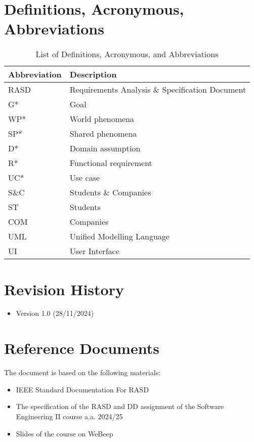 \section{Definitions, Acronymous, Abbreviations}
\begin{table}[H]
\centering
\begin{tabular}{|l|l|}
\hline
\textbf{Abbreviation} & \textbf{Description} \\ \hline
RASD & Requirements Analysis \& Specification Document \\ \hline
G* & Goal \\ \hline
WP* & World phenomena \\ \hline
SP* & Shared phenomena \\ \hline
D* & Domain assumption \\ \hline
R* & Functional requirement \\ \hline
UC* & Use case \\ \hline
S\&C & Students \& Companies \\ \hline
ST & Students \\ \hline
COM & Companies \\ \hline
UML & Unified Modelling Language \\ \hline
UI & User Interface \\ \hline
\end{tabular}
\caption{List of Definitions, Acronymous, and Abbreviations}
\label{table:abbreviations}
\end{table}

  
\section{Revision History}

\begin{itemize}
    \item Version 1.0 (28/11/2024)
\end{itemize}

\section{Reference Documents}

The document is based on the following materials:

\begin{itemize}
    \item IEEE Standard Documentation For RASD
    \item The specification of the RASD and DD assignment of the Software Engineering II course a.a. 2024/25 
    \item Slides of the course on WeBeep
\end{itemize}



